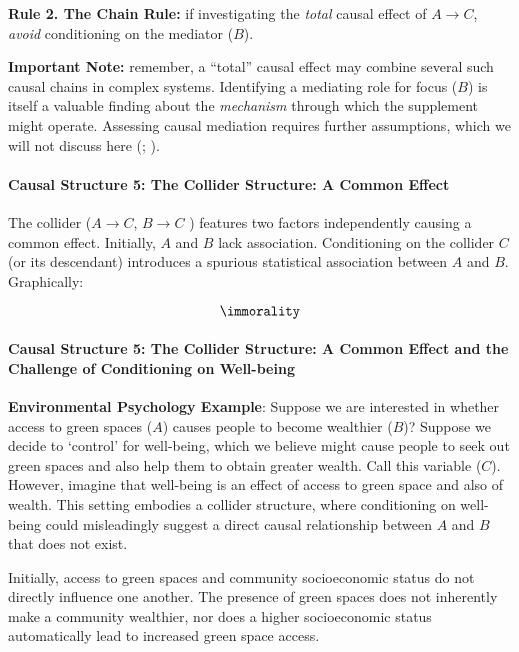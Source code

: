 \documentclass[
  singlecolumn]{article}
\let\oldparagraph\paragraph
\renewcommand{\paragraph}[1]{\oldparagraph{#1}\mbox{}}
\begin{document}
\textbf{Rule 2. The Chain Rule:} if investigating the \emph{total}
causal effect of \(A\to C\), \emph{avoid} conditioning on the mediator
(\(B\)).

\textbf{Important Note:} remember, a ``total'' causal effect may combine
several such causal chains in complex systems. Identifying a mediating
role for focus (\(B\)) is itself a valuable finding about the
\emph{mechanism} through which the supplement might operate. Assessing
causal mediation requires further assumptions, which we will not discuss
here (;
).

\paragraph{Causal Structure 5: The Collider Structure: A Common
Effect}\label{causal-structure-5-the-collider-structure-a-common-effect}

The collider (\(A\to C\), \(B \to C\) ) features two factors
independently causing a common effect. Initially, \(A\) and \(B\) lack
association. Conditioning on the collider \(C\) (or its descendant)
introduces a spurious statistical association between \(A\) and \(B\).
Graphically:

\[\immorality\]

\paragraph{Causal Structure 5: The Collider Structure: A Common Effect
and the Challenge of Conditioning on
Well-being}\label{causal-structure-5-the-collider-structure-a-common-effect-and-the-challenge-of-conditioning-on-well-being}

\textbf{Environmental Psychology Example}: Suppose we are interested in
whether access to green spaces (\(A\)) causes people to become wealthier
(\(B\))? Suppose we decide to `control' for well-being, which we believe
might cause people to seek out green spaces and also help them to obtain
greater wealth. Call this variable (\(C\)). However, imagine that
well-being is an effect of access to green space and also of wealth.
This setting embodies a collider structure, where conditioning on
well-being could misleadingly suggest a direct causal relationship
between \(A\) and \(B\) that does not exist.

Initially, access to green spaces and community socioeconomic status do
not directly influence one another. The presence of green spaces does
not inherently make a community wealthier, nor does a higher
socioeconomic status automatically lead to increased green space access.
\end{document}

